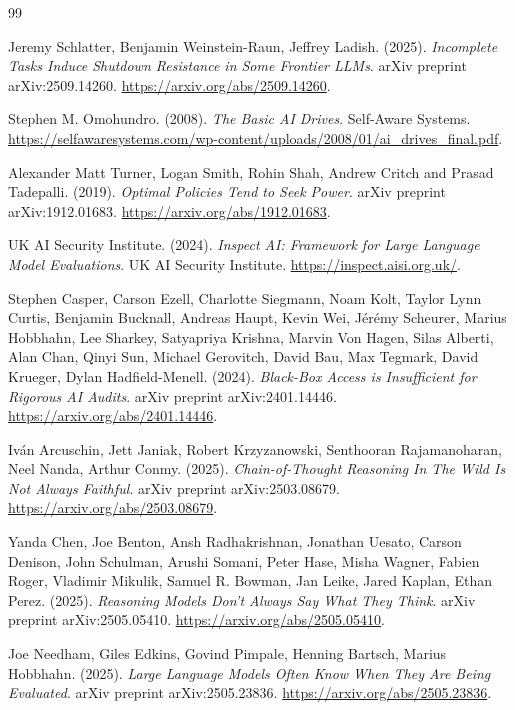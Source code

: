 \documentclass[10pt,a4paper]{article}
\begin{document}
\newpage
\begin{thebibliography}{99}

Jeremy Schlatter, Benjamin Weinstein-Raun, Jeffrey Ladish. (2025). \textit{Incomplete Tasks Induce Shutdown Resistance in Some Frontier LLMs}. arXiv preprint arXiv:2509.14260. \url{https://arxiv.org/abs/2509.14260}.

Stephen M. Omohundro. (2008). \textit{The Basic AI Drives}. Self-Aware Systems. \url{https://selfawaresystems.com/wp-content/uploads/2008/01/ai_drives_final.pdf}.

Alexander Matt Turner, Logan Smith, Rohin Shah, Andrew Critch and Prasad Tadepalli. (2019). \textit{Optimal Policies Tend to Seek Power}. arXiv preprint arXiv:1912.01683. \url{https://arxiv.org/abs/1912.01683}.

UK AI Security Institute. (2024). \textit{Inspect AI: Framework for Large Language Model Evaluations}. UK AI Security Institute. \url{https://inspect.aisi.org.uk/}.

Stephen Casper, Carson Ezell, Charlotte Siegmann, Noam Kolt, Taylor Lynn Curtis, Benjamin Bucknall, Andreas Haupt, Kevin Wei, Jérémy Scheurer, Marius Hobbhahn, Lee Sharkey, Satyapriya Krishna, Marvin Von Hagen, Silas Alberti, Alan Chan, Qinyi Sun, Michael Gerovitch, David Bau, Max Tegmark, David Krueger, Dylan Hadfield-Menell. (2024). \textit{Black-Box Access is Insufficient for Rigorous AI Audits}. arXiv preprint arXiv:2401.14446. \url{https://arxiv.org/abs/2401.14446}.

Iván Arcuschin, Jett Janiak, Robert Krzyzanowski, Senthooran Rajamanoharan, Neel Nanda, Arthur Conmy. (2025). \textit{Chain-of-Thought Reasoning In The Wild Is Not Always Faithful}. arXiv preprint arXiv:2503.08679. \url{https://arxiv.org/abs/2503.08679}.

Yanda Chen, Joe Benton, Ansh Radhakrishnan, Jonathan Uesato, Carson Denison, John Schulman, Arushi Somani, Peter Hase, Misha Wagner, Fabien Roger, Vladimir Mikulik, Samuel R. Bowman, Jan Leike, Jared Kaplan, Ethan Perez. (2025). \textit{Reasoning Models Don't Always Say What They Think}. arXiv preprint arXiv:2505.05410. \url{https://arxiv.org/abs/2505.05410}.

Joe Needham, Giles Edkins, Govind Pimpale, Henning Bartsch, Marius Hobbhahn. (2025). \textit{Large Language Models Often Know When They Are Being Evaluated}. arXiv preprint arXiv:2505.23836. \url{https://arxiv.org/abs/2505.23836}.


\end{thebibliography}
\end{document}
